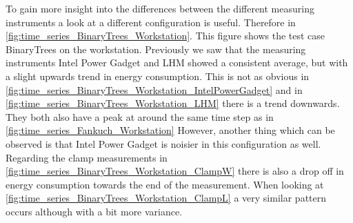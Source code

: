 

To gain more insight into the differences between the different measuring instruments a look at a different configuration is useful. Therefore in \cref{fig:time_series_BinaryTrees_Workstation}. This figure shows the test case BinaryTrees on the workstation. Previously we saw that the measuring instruments Intel Power Gadget and LHM showed a consistent average, but with a slight upwards trend in energy consumption. This is not as obvious in \cref{fig:time_series_BinaryTrees_Workstation_IntelPowerGadget} and in \cref{fig:time_series_BinaryTrees_Workstation_LHM} there is a trend downwards. They both also have a peak at around the same time step as in \cref{fig:time_series_Fankuch_Workstation}
However, another thing which can be observed is that Intel Power Gadget is noisier in this configuration as well.  Regarding the clamp measurements in \cref{fig:time_series_BinaryTrees_Workstation_ClampW} there is also a drop off in energy consumption towards the end of the measurement. When looking at \cref{fig:time_series_BinaryTrees_Workstation_ClampL} a very similar pattern occurs although with a bit more variance. 












